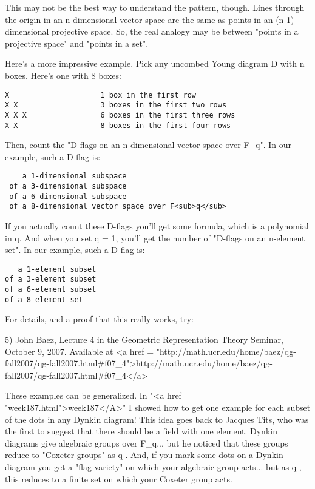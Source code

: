This may not be the best way to understand the pattern, though.
Lines through the origin in an n-dimensional vector space are the 
same as points in an (n-1)-dimensional projective space.  So, the
real analogy may be between "points in a projective space" and 
"points in a set".

Here's a more impressive example.   Pick any uncombed Young diagram D 
with n boxes.  Here's one with 8 boxes:

\begin{verbatim}
X                     1 box in the first row
X X                   3 boxes in the first two rows
X X X                 6 boxes in the first three rows
X X                   8 boxes in the first four rows
\end{verbatim}
    

Then, count the "D-flags on an n-dimensional vector space over
F_{q}".  In our example, such a D-flag is:

\begin{verbatim}
    a 1-dimensional subspace
 of a 3-dimensional subspace
 of a 6-dimensional subspace
 of a 8-dimensional vector space over F<sub>q</sub>
\end{verbatim}
    
If you actually count these D-flags you'll get some formula, which is 
a polynomial in q.  And when you set q = 1, you'll get the number of 
"D-flags on an n-element set".  In our example, such a D-flag is:

\begin{verbatim}
   a 1-element subset 
of a 3-element subset
of a 6-element subset
of a 8-element set
\end{verbatim}
    
For details, and a proof that this really works, try:

5) John Baez, Lecture 4 in the Geometric Representation Theory
Seminar, October 9, 2007.  Available at 
<a href = "http://math.ucr.edu/home/baez/qg-fall2007/qg-fall2007.html#f07_4">http://math.ucr.edu/home/baez/qg-fall2007/qg-fall2007.html#f07_4</a>

These examples can be generalized.  In "<a href =
"week187.html">week187</A>" I showed how to get one example for
each subset of the dots in any Dynkin diagram!  This idea goes back to
Jacques Tits, who was the first to suggest that there should be a
field with one element.  Dynkin diagrams give algebraic groups over
F_{q}... but he noticed that these groups reduce to
"Coxeter groups" as q .  And, if you mark some dots
on a Dynkin diagram you get a "flag variety" on which your
algebraic group acts... but as q , this reduces to a finite set
on which your Coxeter group acts.

